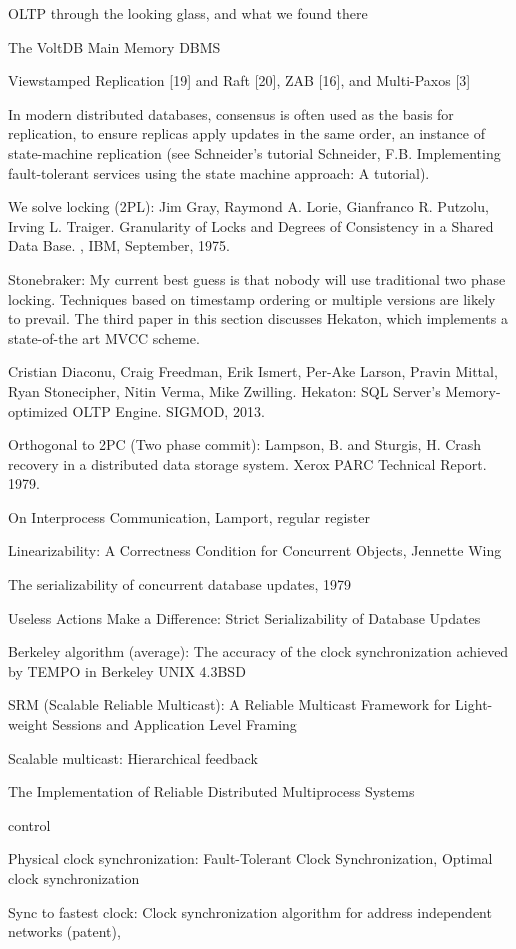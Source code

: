 OLTP through the looking glass, and what we found there

The VoltDB Main Memory DBMS

Viewstamped Replication [19] and Raft [20], ZAB [16], and Multi-Paxos [3]

In modern distributed databases, consensus is often used as the basis for replication, to ensure replicas apply updates in the same order, an instance of state-machine replication (see Schneider’s tutorial Schneider, F.B. Implementing fault-tolerant services using the state machine approach: A tutorial).

We solve locking (2PL): Jim Gray, Raymond A. Lorie, Gianfranco R. Putzolu, Irving L. Traiger. Granularity of Locks and Degrees of Consistency in a Shared Data Base. , IBM, September, 1975.

Stonebraker: My current best guess is that nobody will use traditional two phase locking. Techniques based on timestamp ordering or multiple versions are likely to prevail. The third paper in this section discusses Hekaton, which implements a state-of-the art MVCC scheme.

Cristian Diaconu, Craig Freedman, Erik Ismert, Per-Ake Larson, Pravin Mittal, Ryan Stonecipher, Nitin Verma, Mike Zwilling. Hekaton: SQL Server's Memory-optimized OLTP Engine. SIGMOD, 2013.



Orthogonal to 2PC (Two phase commit):
Lampson, B. and Sturgis, H. Crash recovery in a distributed data storage system. Xerox PARC Technical Report. 1979.

On Interprocess Communication, Lamport, regular register

Linearizability: A Correctness Condition for
Concurrent Objects, Jennette Wing

The serializability of concurrent database updates, 1979

Useless Actions Make a Difference:
Strict Serializability of Database Updates

Berkeley algorithm (average):
The accuracy of the clock synchronization achieved by TEMPO in Berkeley UNIX 4.3BSD

SRM (Scalable Reliable Multicast):
A Reliable Multicast Framework for Light-weight Sessions
and Application Level Framing

Scalable multicast:
Hierarchical feedback 

The Implementation of Reliable Distributed Multiprocess Systems

control~\cite{tanenbaum2007distributed}


Physical clock synchronization: Fault-Tolerant Clock Synchronization, 
Optimal clock synchronization

Sync to fastest clock: Clock synchronization algorithm for address independent networks (patent),
\fi
